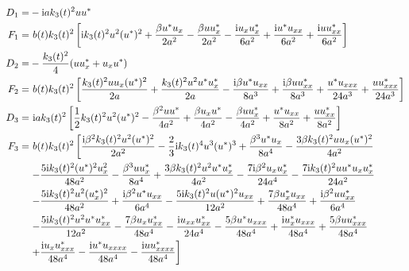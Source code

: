 \documentclass[12pt]{article}
\begin{document}
\begin{align}
 D_{1} =& -\mathrm{i}ak_3(t)^{2} uu^{*} \\
  F_{1} =&\ b(t)k_3(t)^{2} \left[\mathrm{i}k_3(t)^{2}u^2(u^*)^2 + \frac{\beta u^{*}u_{x}}{2a^{2}} - \frac{\beta uu^{*}_{x}}{2a^{2}} - \frac{\mathrm{i}u_{x}u^{*}_{x}}{6a^{2}} + \frac{\mathrm{i}u^{*}u_{xx}}{6a^{2}} + \frac{\mathrm{i}uu^{*}_{xx}}{6a^{2}} \right] \\
  D_{2} =& -\frac{k_{3}(t)^{2}}{4}(uu^{*}_{x} + u_{x}u^{*}) \\
  F_{2} =&\ b(t)k_3(t)^{2} \left[\frac{k_3(t)^{2}uu_x(u^*)^2}{2a} + \frac{k_3(t)^2u^2u^*u^*_x}{2a} -\frac{\mathrm{i}\beta u^*u_{xx}}{8a^3} + \frac{\mathrm{i}\beta uu^*_{xx}}{8a^3} + \frac{u^*u_{xxx}}{24a^3} + \frac{uu^*_{xxx}}{24a^3}  \right] \\
  D_{3} =&\ \mathrm{i}ak_3(t)^2\left[\frac{1}{2}k_3(t)^2u^2(u^*)^2 - \frac{\beta^2 uu^*}{4a^2} + \frac{\beta u_xu^*}{4a^2} - \frac{\beta uu^*_x}{4a^2} + \frac{u^*u_{xx}}{8a^2} + \frac{uu^*_{xx}}{8a^2}\right] \\
  F_{3} =&\ b(t)k_3(t)^{2} \left[ \frac{\mathrm{i}\beta^2k_3(t)^2u^2(u^*)^2}{2a^2} - \frac{2}{3}\mathrm{i}k_3(t)^4u^3(u^*)^3 + \frac{\beta^3 u^*u_x}{8a^4} - \frac{3\beta k_3(t)^2uu_x(u^*)^2}{4a^2} \right. \notag \\
  & \left.- \frac{5\mathrm{i}k_3(t)^2(u^*)^2u_x^2}{48a^2} - \frac{\beta^3uu^*_x}{8a^4} + \frac{3\beta k_3(t)^2u^2u^*u^*_x}{4a^2} - \frac{7\mathrm{i}\beta^2u_xu^*_x}{24a^4} - \frac{7\mathrm{i}k_3(t)^2uu^*u_xu^*_x}{24a^2} \right. \notag\\
  & \left. -\frac{5\mathrm{i}k_3(t)^2u^2(u^*_x)^2}{48a^2} + \frac{\mathrm{i}\beta^2u^*u_{xx}}{6a^4} - \frac{5\mathrm{i}k_3(t)^2u(u^*)^2u_{xx}}{12a^2} + \frac{7\beta u^*_xu_{xx}}{48a^4} + \frac{\mathrm{i}\beta^2uu^*_{xx}}{6a^4} \right. \notag\\
  & \left.  - \frac{5\mathrm{i}k_3(t)^2u^2u^*u^*_{xx}}{12a^2} -\frac{7\beta u_xu^*_{xx}}{48a^4} - \frac{\mathrm{i}u_{xx}u^*_{xx}}{24a^4} - \frac{5\beta u^*u_{xxx}}{48a^4} + \frac{\mathrm{i}u^*_xu_{xxx}}{48a^4} + \frac{5\beta uu^*_{xxx}}{48a^4} \right. \notag\\
  & \left. + \frac{\mathrm{i}u_xu^*_{xxx}}{48a^4} - \frac{\mathrm{i}u^*u_{xxxx}}{48a^4} - \frac{\mathrm{i}uu^*_{xxxx}}{48a^4} \right]
\end{align}
\end{document}
